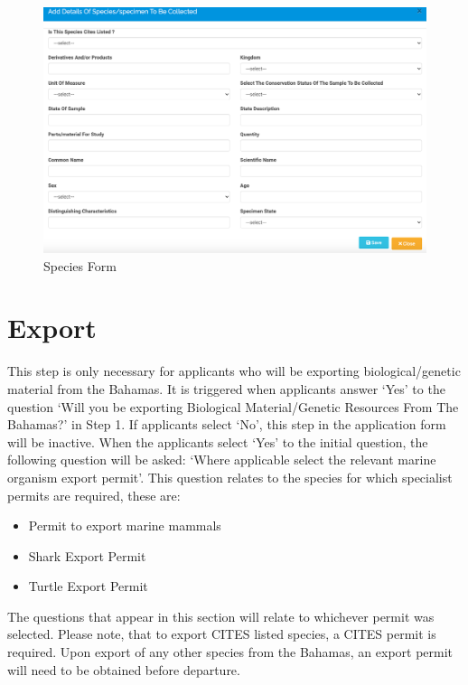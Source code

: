 \documentclass[
]{book}
\providecommand{\tightlist}{%
  \setlength{\itemsep}{0pt}\setlength{\parskip}{0pt}}
\begin{document}
\begin{figure}
\centering
\includegraphics{images/species_form.png}
\caption{Species Form}
\end{figure}

\hypertarget{export}{%
\chapter{Export}\label{export}}

This step is only necessary for applicants who will be exporting biological/genetic material from the Bahamas. It is triggered when applicants answer `Yes' to the question `Will you be exporting Biological Material/Genetic Resources From The Bahamas?' in Step 1. If applicants select `No', this step in the application form will be inactive. When the applicants select `Yes' to the initial question, the following question will be asked: `Where applicable select the relevant marine organism export permit'. This question relates to the species for which specialist permits are required, these are:

\begin{itemize}
\tightlist
\item
  Permit to export marine mammals
\item
  Shark Export Permit
\item
  Turtle Export Permit
\end{itemize}

The questions that appear in this section will relate to whichever permit was selected. Please note, that to export CITES listed species, a CITES permit is required. Upon export of any other species from the Bahamas, an export permit will need to be obtained before departure.
\end{document}
